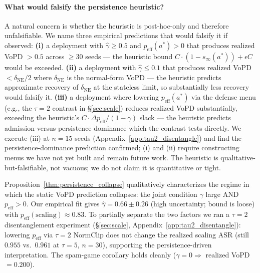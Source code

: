 \documentclass{article}
\begin{document}
\paragraph{What would falsify the persistence heuristic?} A natural concern is whether the heuristic is post-hoc-only and therefore unfalsifiable. We name three empirical predictions that would falsify it if observed: \textbf{(i)} a deployment with $\hat\gamma \geq 0.5$ and $p_{\mathrm{eff}}(a^*) > 0$ that produces realized VoPD $> 0.5$ across $\geq 30$ seeds --- the heuristic bound $C \cdot (1 - s_\infty(a^*)) + \epsilon C$ would be exceeded. \textbf{(ii)} a deployment with $\hat\gamma \leq 0.1$ that produces realized VoPD $< \delta_{\mathrm{NE}}/2$ where $\delta_{\mathrm{NE}}$ is the normal-form VoPD --- the heuristic predicts approximate recovery of $\delta_{\mathrm{NE}}$ at the stateless limit, so substantially less recovery would falsify it. \textbf{(iii)} a deployment where lowering $p_{\mathrm{eff}}(a^*)$ via the defense menu (e.g., the $\tau{=}2$ contrast in §\ref{sec:scale}) reduces realized VoPD substantially, exceeding the heuristic's $C \cdot \Delta p_{\mathrm{eff}} / (1-\gamma)$ slack --- the heuristic predicts admission-versus-persistence dominance which the contrast tests directly. We execute (iii) at $n=15$ seeds (Appendix~\ref{app:tau2_disentangle}) and find the persistence-dominance prediction confirmed; (i) and (ii) require constructing menus we have not yet built and remain future work. The heuristic is qualitative-but-falsifiable, not vacuous; we do not claim it is quantitative or tight.

Proposition~\ref{thm:persistence_collapse} qualitatively characterizes the regime in which the static VoPD prediction collapses: the joint condition $\gamma$ large AND $p_{\mathrm{eff}} > 0$. Our empirical fit gives $\hat\gamma=0.66\pm0.26$ (high uncertainty; bound is loose) with $p_{\mathrm{eff}}(\text{scaling})\approx 0.83$. To partially separate the two factors we ran a $\tau{=}2$ disentanglement experiment (§\ref{sec:scale}, Appendix~\ref{app:tau2_disentangle}): lowering $p_{\mathrm{eff}}$ via $\tau{=}2$ NormClip does not change the realized scaling ASR (still $0.955$ vs.\ $0.961$ at $\tau{=}5$, $n{=}30$), supporting the persistence-driven interpretation. The spam-game corollary holds cleanly ($\gamma = 0 \Rightarrow$ realized VoPD $= 0.200$).
\end{document}
